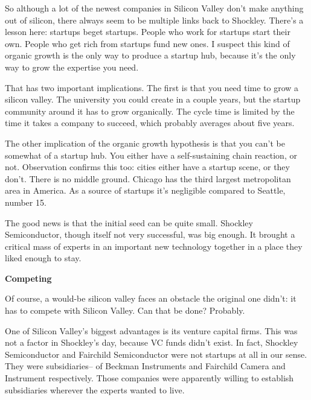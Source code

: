So although a lot
                  of the newest companies in Silicon Valley don't make anything
                  out of silicon, there always seem to be multiple links back to
                  Shockley. There's a lesson here: startups beget startups.
                  People who work for startups start their own. People who get
                  rich from startups fund new ones. I suspect this kind of
                  organic growth is the only way to produce a startup hub,
                  because it's the only way to grow the expertise you need.

That
                  has two important implications. The first is that you need
                  time to grow a silicon valley. The university you could create
                  in a couple years, but the startup community around it has to
                  grow organically. The cycle time is limited by the time it
                  takes a company to succeed, which probably averages about five
                  years.

The other implication of the organic growth
                  hypothesis is that you can't be somewhat of a startup hub. You
                  either have a self-sustaining chain reaction, or not.
                  Observation confirms this too: cities either have a startup
                  scene, or they don't. There is no middle ground. Chicago has
                  the third largest metropolitan area in America. As a source of
                  startups it's negligible compared to Seattle, number 15.

The
                  good news is that the initial seed can be quite small.
                  Shockley Semiconductor, though itself not very successful, was
                  big enough. It brought a critical mass of experts in an
                  important new technology together in a place they liked enough
                  to stay.

\textbf{Competing}

Of course, a
                  would-be silicon valley faces an obstacle the original one
                  didn't: it has to compete with Silicon Valley. Can that be
                  done? Probably.

One of Silicon Valley's biggest
                  advantages is its venture capital firms. This was not a factor
                  in Shockley's day, because VC funds didn't exist. In fact,
                  Shockley Semiconductor and Fairchild Semiconductor were not
                  startups at all in our sense. They were subsidiaries-- of
                  Beckman Instruments and Fairchild Camera and Instrument
                  respectively. Those companies were apparently willing to
                  establish subsidiaries wherever the experts wanted to live.


